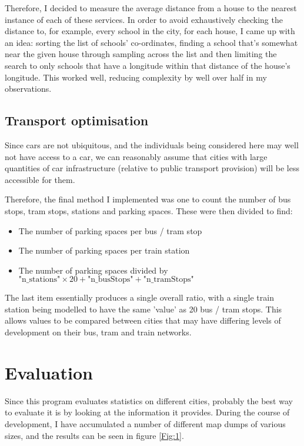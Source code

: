 \documentclass[11pt]{article} %
\begin{document}
Therefore, I decided to measure the average distance from a house to the nearest instance of each of these services. In order to avoid exhaustively checking the distance to, for example, every school in the city, for each house, I came up with an idea: sorting the list of schools' co-ordinates, finding a school that's somewhat near the given house through sampling across the list and then limiting the search to only schools that have a longitude within that distance of the house's longitude. This worked well, reducing complexity by well over half in my observations.

\subsection{Transport optimisation}
Since cars are not ubiquitous, and the individuals being considered here may well not have access to a car, we can reasonably assume that cities with large quantities of car infrastructure (relative to public transport provision) will be less accessible for them.

Therefore, the final method I implemented was one to count the number of bus stops, tram stops, stations and parking spaces. These were then divided to find:

\begin{itemize}
	\item The number of parking spaces per bus / tram stop
	\item The number of parking spaces per train station
	\item The number of parking spaces divided by $\text{"n\_stations"}\times 20 + \text{"n\_busStops"} + \text{"n\_tramStops"}$
\end{itemize}

The last item essentially produces a single overall ratio, with a single train station being modelled to have the same 'value' as 20 bus / tram stops. This allows values to be compared between cities that may have differing levels of development on their bus, tram and train networks.


\section{Evaluation}
Since this program evaluates statistics on different cities, probably the best way to evaluate it is by looking at the information it provides. During the course of development, I have accumulated a number of different map dumps of various sizes, and the results can be seen in figure \ref{Fig:1}.
\end{document}
